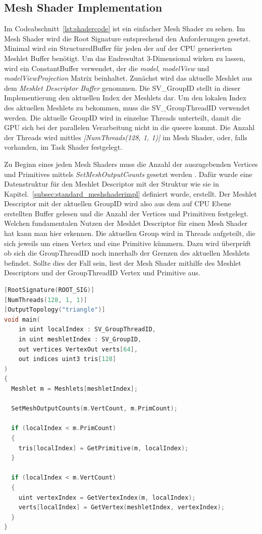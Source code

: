 \subsection{Mesh Shader Implementation}
\label{subsec:mesh_shader_impl}
Im Codeabschnitt~\ref{lst:shadercode} ist ein einfacher Mesh Shader zu sehen.
Im Mesh Shader wird die Root Signature entsprechend den Anforderungen gesetzt.
Minimal wird ein StructuredBuffer für jeden der auf der CPU generierten Meshlet Buffer benötigt.
Um das Endresultat 3-Dimensional wirken zu lassen, wird ein ConstantBuffer verwendet, der die \textit{model}, \textit{modelView} und \textit{modelViewProjection} Matrix beinhaltet.
Zunächst wird das aktuelle Meshlet aus dem \textit{Meshlet Descriptor Buffer} genommen.
Die SV\_GroupID stellt in dieser Implementierung den aktuellen Index der Meshlets dar.
Um den lokalen Index des aktuellen Meshlets zu bekommen, muss die SV\_GroupThreadID verwendet werden.
Die aktuelle GroupID wird in einzelne Threads unterteilt, damit die GPU sich bei der parallelen Verarbeitung nicht in die queere kommt.
Die Anzahl der Threads wird mittles \textit{[NumThreads(128, 1, 1)]} im Mesh Shader, oder, falls vorhanden, im Task Shader festgelegt. \newline

Zu Beginn eines jeden Mesh Shaders muss die Anzahl der auszugebenden Vertices und Primitives mittels \textit{SetMeshOutputCounts} gesetzt werden \cite{Jobalia2019}.
Dafür wurde eine Datenstruktur für den Meshlet Descriptor mit der Struktur wie sie in Kapitel.~\ref{subsec:standard_meshshaderimpl} definiert wurde, erstellt.
Der Meshlet Descriptor mit der aktuellen GroupID wird also aus dem auf CPU Ebene erstellten Buffer gelesen und die Anzahl der Vertices und Primitiven festgelegt.
Welchen fundamentalen Nutzen der Meshlet Descriptor für einen Mesh Shader hat kann man hier erkennen.
Die aktuellen Group wird in Threads aufgeteilt, die sich jeweils um einen Vertex und eine Primitive kümmern.
Dazu wird überprüft ob sich die GroupThreadID noch innerhalb der Grenzen des aktuellen Meshlets befindet.
Sollte dies der Fall sein, liest der Mesh Shader mithilfe des Meshlet Descriptors und der GroupThreadID Vertex und Primitive aus.

\newpage \begin{lstlisting}[language = C++, caption = Standard Mesh Shader main-Methode, label=lst:shadercode]
[RootSignature(ROOT_SIG)]
[NumThreads(128, 1, 1)]
[OutputTopology("triangle")]
void main(
    in uint localIndex : SV_GroupThreadID,
    in uint meshletIndex : SV_GroupID,
    out vertices VertexOut verts[64],
    out indices uint3 tris[128]
)
{
  Meshlet m = Meshlets[meshletIndex];

  SetMeshOutputCounts(m.VertCount, m.PrimCount);
  
  if (localIndex < m.PrimCount)
  {
    tris[localIndex] = GetPrimitive(m, localIndex);
  }
  
  if (localIndex < m.VertCount)
  {
    uint vertexIndex = GetVertexIndex(m, localIndex);
    verts[localIndex] = GetVertex(meshletIndex, vertexIndex);
  }
}
\end{lstlisting}

